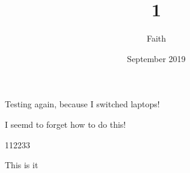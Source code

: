 \documentclass{article}
\title{1}
\author{Faith}
\date{September 2019}
\begin{document}
\maketitle
Testing again, because I switched laptops!

I seemd to forget how to do this!

112233

This is it
\end{document}
